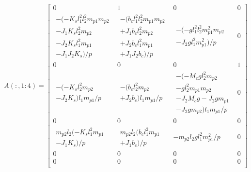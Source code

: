 \documentclass{article}
\begin{document}
\begin{equation*}
A(:,1:4) = \begin{bmatrix}
0 & 1 & 0 & 0 \\

\begin{split}
-(-K_s l_1^2 l_2^2 m_{p1} m_{p2} \\ -J_1 K_s l_2^2 m_{p2} \\ -J_2 K_s l_1^2 m_{p1} \\ -J_1 J_2 K_s)/p
\end{split}
&
\begin{split}
-(b_c l_1^2 l_2^2 m_{p1} m_{p2} \\ +J_1 b_c l_2^2 m_{p2} \\ +J_2 b_c l_1^2 m_{p1} \\ +J_1 J_2 b_c)/p
\end{split}
&
\begin{split}
-(-g l_1^2 l_2^2 m_{p1}^2 m_{p2} \\ -J_2 g l_1^2 m_{p1}^2)/p
\end{split}
&
0 \\

0 & 0 & 0 & 1 \\

\begin{split}
-(-K_s l_2^2 m_{p2} \\ -J_2 K_s) l_1 m_{p1}/p
\end{split}
&
\begin{split}
-(b_c l_2^2 m_{p2} \\ +J_2 b_c) l_1 m_{p1}/p
\end{split}
&
\begin{split}
-(-M_c g l_2^2 m_{p2} \\ -g l_2^2 m_{p1} m_{p2} \\ -J_2 M_c g-J_2 g m_{p1} \\ -J_2 g m_{p2}) l_1 m_{p1}/p
\end{split}
&
0 \\

0 & 0 & 0 & 0 \\

\begin{split}
m_{p2} l_2 (-K_s l_1^2 m_{p1} \\ -J_1 K_s)/p
\end{split}
&
\begin{split}
m_{p2} l_2 (b_c l_1^2 m_{p1} \\ +J_1 b_c)/p
\end{split}
&
-m_{p2} l_2 g l_1^2 m_{p1}^2/p
&
0 \\

0 & 0 & 0 & 0 \\

0 & 0 & 0 & 0 \\
\end{bmatrix}
\end{equation*}
\end{document}
